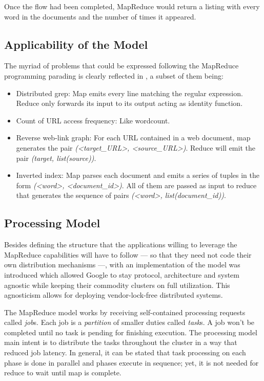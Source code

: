 Once the flow had been completed, MapReduce would return a listing with every word in the documents and the number of times it appeared.

\subsection{Applicability of the Model}\label{subsec:aplicabilidad}

\noindent The myriad of problems that could be expressed following the MapReduce programming parading is clearly reflected in \cite{googlemapreduce}, a subset of them being:

\begin{itemize}
 \item Distributed grep: Map emits every line matching the regular expression. Reduce only forwards its input to its output acting as identity function.
 \item Count of URL access frequency: Like wordcount.
 \item Reverse web-link graph: For each URL contained in a web document, map generates the pair \emph{(<target_URL>, <source_URL>)}. Reduce will emit the pair \emph{(target, list(source))}.
 \item Inverted index: Map parses each document and emits a series of tuples in the form \emph{(<word>, <document_id>)}. All of them are passed as input to reduce that generates the sequence of pairs \emph{(<word>, list(document_id))}.
\end{itemize}

\subsection{Processing Model}\label{subsec:processingmodel}

\noindent Besides defining the structure that the applications willing to leverage the MapReduce capabilities will have to follow --- so that they need not code their own distribution mechanisms ---, with \cite{googlemapreduce} an implementation of the model was introduced which allowed Google to stay protocol, architecture and system agnostic while keeping their commodity clusters on full utilization. This agnosticism allows for deploying vendor-lock-free distributed systems.

The MapReduce model works by receiving self-contained processing requests called \emph{job}s. Each job is a \emph{partition} of smaller duties called \emph{task}s. A job won't be completed until no task is pending for finishing execution. The processing model main intent is to distribute the tasks throughout the cluster in a way that reduced job latency. In general, it can be stated that task processing on each phase is done in parallel and phases execute in sequence; yet, it is not needed for reduce to wait until map is complete.

